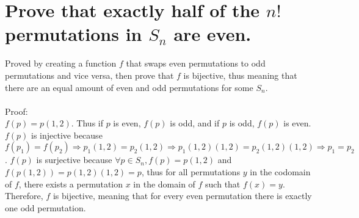 \documentclass[12pt]{article}
\begin{document}
\section{Prove that exactly half of the $n!$ permutations in $S_n$ are even.}
Proved by creating a function $f$ that swaps even permutations to odd permutations and vice versa, then prove that $f$ is bijective, thus meaning that there are an equal amount of even and odd permutations for some $S_n$.\\\\
Proof:\\
$f(p) = p(1,2)$. Thus if $p$ is even, $f(p)$ is odd, and if $p$ is odd, $f(p)$ is even. $f(p)$ is injective because $f(p_1) = f(p_2) \Rightarrow p_1(1,2) = p_2(1,2) \Rightarrow p_1(1,2)(1,2) = p_2(1,2)(1,2) \Rightarrow p_1 = p_2$. $f(p)$ is surjective because $ \forall p \in S_n, f(p) = p(1,2)$ and $f(p(1,2)) = p(1,2)(1,2) = p$, thus for all permutations $y$ in the codomain of $f$, there exists a permutation $x$ in the domain of $f$ such that $f(x) = y$. Therefore, $f$ is bijective, meaning that for every even permutation there is exactly one odd permutation.
\end{document}
